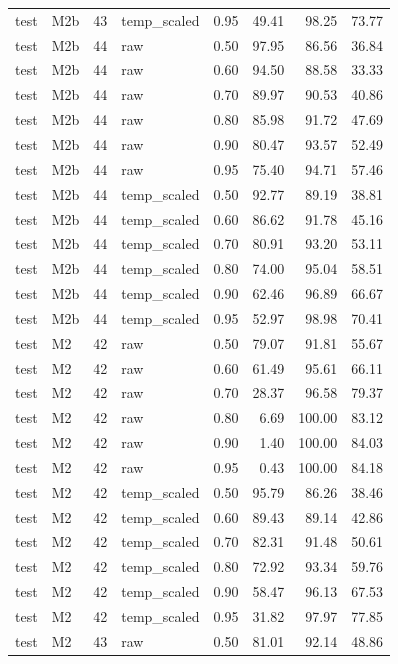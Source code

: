 \begin{tabular}{llrlrrrr}
test & M2b & 43 & temp\_scaled & 0.95 & 49.41 & 98.25 & 73.77 \\
test & M2b & 44 & raw & 0.50 & 97.95 & 86.56 & 36.84 \\
test & M2b & 44 & raw & 0.60 & 94.50 & 88.58 & 33.33 \\
test & M2b & 44 & raw & 0.70 & 89.97 & 90.53 & 40.86 \\
test & M2b & 44 & raw & 0.80 & 85.98 & 91.72 & 47.69 \\
test & M2b & 44 & raw & 0.90 & 80.47 & 93.57 & 52.49 \\
test & M2b & 44 & raw & 0.95 & 75.40 & 94.71 & 57.46 \\
test & M2b & 44 & temp\_scaled & 0.50 & 92.77 & 89.19 & 38.81 \\
test & M2b & 44 & temp\_scaled & 0.60 & 86.62 & 91.78 & 45.16 \\
test & M2b & 44 & temp\_scaled & 0.70 & 80.91 & 93.20 & 53.11 \\
test & M2b & 44 & temp\_scaled & 0.80 & 74.00 & 95.04 & 58.51 \\
test & M2b & 44 & temp\_scaled & 0.90 & 62.46 & 96.89 & 66.67 \\
test & M2b & 44 & temp\_scaled & 0.95 & 52.97 & 98.98 & 70.41 \\
test & M2 & 42 & raw & 0.50 & 79.07 & 91.81 & 55.67 \\
test & M2 & 42 & raw & 0.60 & 61.49 & 95.61 & 66.11 \\
test & M2 & 42 & raw & 0.70 & 28.37 & 96.58 & 79.37 \\
test & M2 & 42 & raw & 0.80 & 6.69 & 100.00 & 83.12 \\
test & M2 & 42 & raw & 0.90 & 1.40 & 100.00 & 84.03 \\
test & M2 & 42 & raw & 0.95 & 0.43 & 100.00 & 84.18 \\
test & M2 & 42 & temp\_scaled & 0.50 & 95.79 & 86.26 & 38.46 \\
test & M2 & 42 & temp\_scaled & 0.60 & 89.43 & 89.14 & 42.86 \\
test & M2 & 42 & temp\_scaled & 0.70 & 82.31 & 91.48 & 50.61 \\
test & M2 & 42 & temp\_scaled & 0.80 & 72.92 & 93.34 & 59.76 \\
test & M2 & 42 & temp\_scaled & 0.90 & 58.47 & 96.13 & 67.53 \\
test & M2 & 42 & temp\_scaled & 0.95 & 31.82 & 97.97 & 77.85 \\
test & M2 & 43 & raw & 0.50 & 81.01 & 92.14 & 48.86 \\

\end{tabular}
